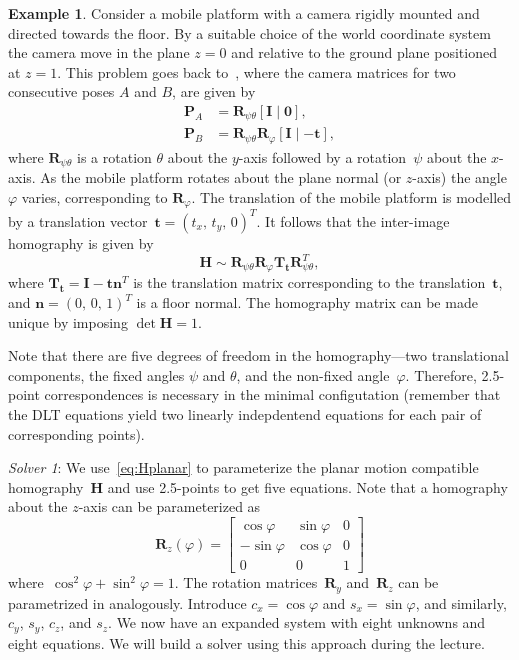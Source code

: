 \documentclass[11pt,a4paper]{article}
\theoremstyle{definition}
\newtheorem{example}{Example}
\renewcommand{\phi}{\varphi}
\newcommand{\T}{T}
\newcommand{\mat}[1]{\bm{#1}}
\begin{document}
\begin{example}\label{ex:Hplanar1}
Consider a mobile platform with a camera rigidly mounted and directed towards the floor.
By a suitable choice of the
world coordinate system the camera move in the plane $z=0$ and relative to the ground plane
positioned at $z=1$. This problem goes back to~\cite{wadenback2013},
where the camera matrices for two consecutive
poses $A$ and $B$, are given by
\begin{equation}\label{paper03:eq:cammats}
\begin{aligned}
    \mat{P}_A &= \mat{R}_{\psi\theta}[\mat{I}\;|\;\mat{0}],\\
    \mat{P}_B &= \mat{R}_{\psi\theta}\mat{R}_\phi[\mat{I}\;|\;{-\mat{t}}],
\end{aligned}
\end{equation}
where $\mat{R}_{\psi\theta}$ is a rotation $\theta$ about the $y$-axis followed by
a rotation~$\psi$ about the $x$-axis. As the mobile platform rotates about the
plane normal (or $z$-axis) the angle $\phi$ varies, corresponding to $\mat{R}_\phi$.
The translation of the mobile platform is modelled by a translation vector~$\mat{t}=(t_x,\,t_y,\,0)^{\T}$.
It follows that the inter-image homography is given by
\begin{equation}\label{eq:Hplanar}
    \mat{H} \sim \mat{R}_{\psi\theta}\mat{R}_{\phi}\mat{T}_{\mat{t}}\mat{R}_{\psi\theta}^{\T},
\end{equation}
where $\mat{T}_{\mat{t}}=\mat{I}-\mat{tn}^{\T}$ is the translation matrix corresponding
to the translation~$\mat{t}$, and $\mat{n}=(0,\,0,\,1)^{\T}$ is a floor normal.
The homography matrix can be made unique by imposing $\det{\mat{H}}=1$.

Note that there are five degrees of freedom in the homography---two translational components,
the fixed angles $\psi$ and $\theta$, and the non-fixed angle~$\phi$. Therefore, 2.5-point
correspondences is necessary in the minimal configutation (remember that the DLT equations yield
two linearly indepdentend equations for each pair of corresponding points).

\emph{Solver 1}: We use~\eqref{eq:Hplanar} to parameterize the planar motion compatible
homography~$\mat{H}$ and use 2.5-points to get five equations. Note that a homography about the
$z$-axis can be parameterized as
\begin{equation}
    \mat{R}_z(\phi) = \begin{bmatrix}
        \cos{\phi} & \sin{\phi} & 0 \\
        -\sin{\phi} & \cos{\phi} & 0 \\
        0 &0 &1
    \end{bmatrix}
\end{equation}
where~$\cos^2{\phi}+\sin^2{\phi} = 1$. The rotation matrices~$\mat{R}_y$ and~$\mat{R}_z$
can be parametrized in analogously. Introduce $c_x=\cos{\phi}$ and $s_x=\sin{\phi}$, and similarly,
$c_y$, $s_y$, $c_z$, and $s_z$. We now have an expanded system with eight unknowns and
eight equations. We will build a solver using this approach during the lecture.


\end{example}
\end{document}

